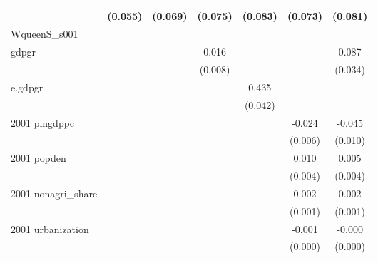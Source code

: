 \begin{table}[htbp]
\begin{tabular}{l*{6}{c}}
                    &     (0.055)         &     (0.069)         &     (0.075)         &     (0.083)         &     (0.073)         &     (0.081)         \\
\hline
WqueenS\_s001        &                     &                     &                     &                     &                     &                     \\
gdpgr               &                     &                     &       0.016\sym{**} &                     &                     &       0.087\sym{**} \\
                    &                     &                     &     (0.008)         &                     &                     &     (0.034)         \\
e.gdpgr             &                     &                     &                     &       0.435\sym{***}&                     &                     \\
                    &                     &                     &                     &     (0.042)         &                     &                     \\
2001 plngdppc       &                     &                     &                     &                     &      -0.024\sym{***}&      -0.045\sym{***}\\
                    &                     &                     &                     &                     &     (0.006)         &     (0.010)         \\
2001 popden         &                     &                     &                     &                     &       0.010\sym{***}&       0.005         \\
                    &                     &                     &                     &                     &     (0.004)         &     (0.004)         \\
2001 nonagri\_share  &                     &                     &                     &                     &       0.002\sym{***}&       0.002\sym{***}\\
                    &                     &                     &                     &                     &     (0.001)         &     (0.001)         \\
2001 urbanization   &                     &                     &                     &                     &      -0.001\sym{***}&      -0.000         \\
                    &                     &                     &                     &                     &     (0.000)         &     (0.000)         \\

\end{tabular}
\end{table}

